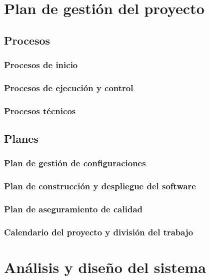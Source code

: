 \documentclass{article}
\begin{document}
\section{Plan de gestión del proyecto}

\subsection{Procesos}

\subsubsection{Procesos de inicio}

\subsubsection{Procesos de ejecución y control}

\subsubsection{Procesos técnicos}

\subsection{Planes}

\subsubsection{Plan de gestión de configuraciones}

\subsubsection{Plan de construcción y despliegue del software}

\subsubsection{Plan de aseguramiento de calidad}

\subsubsection{Calendario del proyecto y división del trabajo}

\section{Análisis y diseño del sistema}
\end{document}
